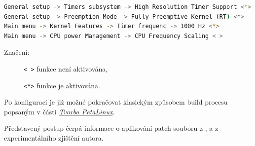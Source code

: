 \documentclass[a4paper, twoside, 11pt]{article}
\begin{document}
				\begin{lstlisting}[language={sh}, caption={Úpravy v konfiguraci jádra pro RT patch.}, label= {lst:kernel-config-rt-patch}]
General setup -> Timers subsystem -> High Resolution Timer Support <*>
General setup -> Preemption Mode -> Fully Preemptive Kernel (RT) <*>
Main menu -> Kernel Features -> Timer frequenc -> 1000 Hz <*>
Main menu -> CPU power Management -> CPU Frequency Scaling < >\end{lstlisting}

				\noindent Značení:
				\begin{description}
					\item[] \texttt{< >} funkce není aktivována,
					\item[] \texttt{<*>} funkce je aktivována.
				\end{description}

				Po konfiguraci je již možné pokračovat klasickým způsobem build procesu popsaným v části \hyperref[subsec:tvorba-petalinux]{\textit{Tvorba PetaLinux}}.\par
				Představený postup čerpá informace o aplikování patch souboru z \cite{hackster-real-time-optimization-in-petalinux-with-rt-patch-on-mpsoc}, \cite{trenz-electronic-wiki-how-to-install-the-linux-rt} a z experimentálního zjištění autora.


			
\end{document}
